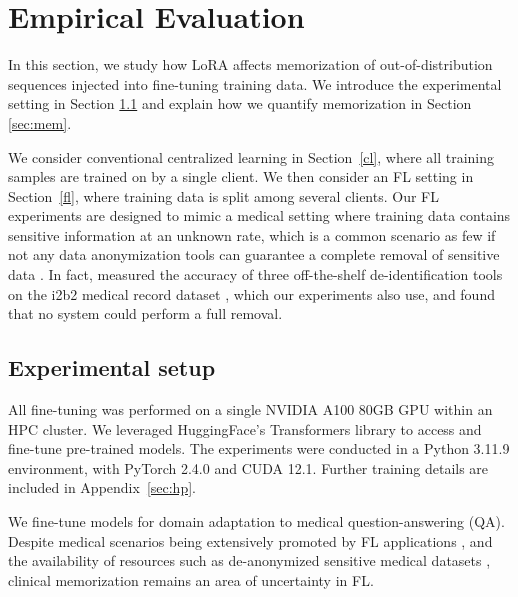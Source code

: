 \section{Empirical Evaluation}
\label{experiments}
In this section, we study how LoRA affects memorization of out-of-distribution sequences injected into fine-tuning training data. We introduce the experimental setting in Section \ref{sec:setup} and explain how we quantify memorization in Section \ref{sec:mem}.

We consider conventional centralized learning in Section~\ref{cl}, where all training samples are trained on by a single client. We then consider an FL setting in Section~\ref{fl}, where training data is split among several clients. Our FL experiments are designed to mimic a medical setting where training data contains sensitive information at an unknown rate, which is a common scenario as few if not any data anonymization tools can guarantee a complete removal of sensitive data \citep{langarizadeh2018dw}. In fact,  \citet{heider2020comp} measured the accuracy of three off-the-shelf de-identification tools on the i2b2 medical record dataset \citep{phi}, which our experiments also use, and found that no system could perform a full removal.


\subsection{Experimental setup}
\label{sec:setup}
All fine-tuning was performed on a single NVIDIA A100 80GB GPU within an HPC cluster. We leveraged HuggingFace's Transformers library \citep{wolf2020hugging} to access and fine-tune pre-trained models. The experiments were conducted in a Python 3.11.9 environment, with PyTorch 2.4.0 and CUDA 12.1. Further training details are included in Appendix~\ref{sec:hp}.


We fine-tune models for domain adaptation to medical question-answering (QA).
Despite medical scenarios being extensively promoted by FL applications \citep{xu2021federated, nguyen2022federated, antunes2022federated}, and the availability of resources such as de-anonymized sensitive medical datasets \citep{johnson2016mimic, phi}, clinical memorization remains an area of uncertainty in FL.

